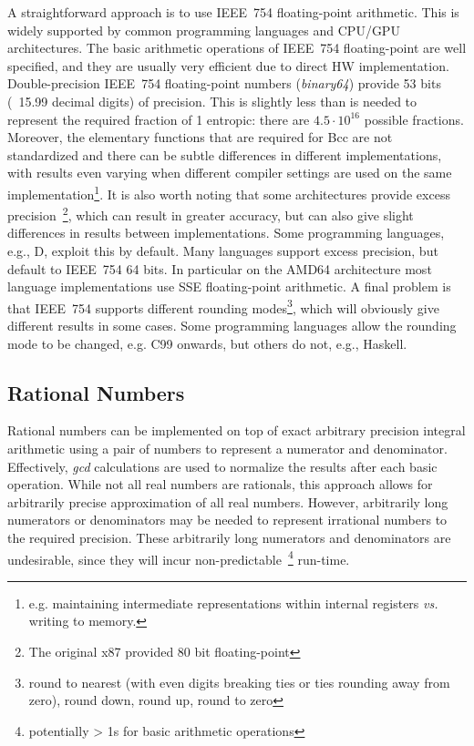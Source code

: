 \documentclass[11pt,a4paper,dvipsnames,twosided]{article}
\theoremstyle{definition}
\theoremstyle{definition}
\begin{document}
A straightforward approach is to use IEEE~754 floating-point arithmetic.  This is
widely supported by common programming languages and CPU/GPU architectures.
%
The basic arithmetic operations of IEEE~754 floating-point are well specified,
and they are usually very efficient due to direct HW implementation.
%
Double-precision IEEE~754 floating-point numbers (\emph{binary64}) provide 53 bits (~15.99 decimal digits) of
precision.  This is slightly less than is needed to represent the
required fraction of 1 entropic: there are $4.5\cdot10^{16}$ possible fractions.
Moreover, the  elementary functions that are required for Bcc are not standardized and there can be
subtle differences in different implementations, with results even varying when different compiler settings are used
on the same implementation\footnote{e.g. maintaining intermediate representations within internal registers \emph{vs.} writing to memory.}. It is also worth noting that some architectures
provide excess precision~\footnote{The original x87 provided 80 bit
  floating-point}, which can result in greater accuracy, but can also give slight differences in results
between implementations. Some programming languages, e.g., D, exploit this by default. Many
languages support excess precision, but default to IEEE~754 64 bits. In
particular on the AMD64 architecture most language implementations use SSE floating-point arithmetic.
A final problem is that IEEE~754 supports different rounding modes\footnote{round to nearest (with even digits breaking ties or ties rounding away from zero), round down, round up, round to zero},  which will obviously give
different results in some cases.  Some programming languages allow the rounding mode to be changed, e.g. C99 onwards, but others do
not, e.g., Haskell.

\subsection{Rational Numbers}
\label{sec:rational-numbers}

Rational numbers can be implemented on top of exact arbitrary precision integral
arithmetic using a pair of numbers to represent a numerator and denominator.
Effectively, \emph{gcd} calculations are used to normalize the results
after each basic operation. While not all real numbers are rationals, this approach allows for
arbitrarily precise approximation of all real numbers. However, arbitrarily
long numerators or denominators may be needed to represent irrational numbers to the required precision.
These arbitrarily long numerators and denominators are undesirable, since they will incur non-predictable~\footnote{potentially > 1s for basic arithmetic operations}
run-time.
\end{document}
